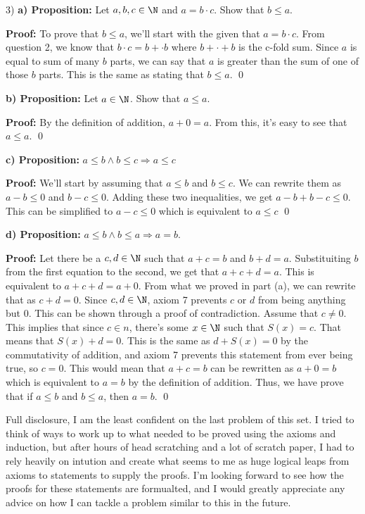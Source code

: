     \begin{paragraph}{3)}
        \textbf{a) Proposition:} Let $a, b, c \in \N$ and $a = b \cdot c$. Show that $b \leq a$.
        \spacing

        \textbf{Proof:} To prove that $b \leq a$, we'll start with the given that $a = b \cdot c$.
        From question 2, we know that $b \cdot c = b + \cdot b$ where $b + \cdot + b$ is the c-fold sum.
        Since $a$ is equal to sum of many $b$ parts, we can say that $a$ is greater than the sum of one of those
        $b$ parts. This is the same as stating that $b \leq a$. \qed
        \bigskip

        \textbf{b) Proposition:} Let $a \in \N$. Show that $a \leq a$.
        \spacing

        \textbf{Proof:} By the definition of addition, $a + 0 = a$. From this, it's easy to see that $a \leq a$. \qed
        \bigskip

        \textbf{c) Proposition:} $a \leq b \land b \leq c \Rightarrow a \leq c$
        \spacing

        \textbf{Proof:} We'll start by assuming that $a \leq b$ and $b \leq c$. We can rewrite them as 
        $a - b \leq 0$ and $b - c \leq 0$. Adding these two inequalities, we get $a - b + b - c \leq 0$.
        This can be simplified to $a - c \leq 0$ which is equivalent to $a \leq c$ \qed
        \bigskip

        \textbf{d) Proposition:} $a \leq b \land b \leq a \Rightarrow a = b$.
        \spacing

        \textbf{Proof:} Let there be a $c, d \in \N$ such that $a + c = b$ and $b + d = a$. Substituiting $b$
        from the first equation to the second, we get that $a + c + d = a$. This is equivalent to 
        $a + c + d = a + 0$. From what we proved in part (a), we can rewrite that as $c + d = 0$. Since 
        $c, d \in \N$, axiom 7 prevents $c$ or $d$ from being anything but 0. This can be shown through a proof of
        contradiction. Assume that $c \neq 0$. This implies that since $c \in n$, there's some $x \in \N$ such that
        $S(x) = c$. That means that $S(x) + d = 0$. This is the same as $d + S(x) = 0$ by the commutativity of addition,
        and axiom 7 prevents this statement from ever being true, so $c = 0$. This would mean that $a + c = b$
        can be rewritten as $a + 0 = b$ which is equivalent to $a = b$ by the definition of addition. Thus, 
        we have prove that if $a \leq b$ and $b \leq a$, then $a = b$. \qed
        \bigskip

        Full disclosure, I am the least confident on the last problem of this set. I tried to think
        of ways to work up to what needed to be proved using the axioms and induction, but after hours of head scratching
        and a lot of scratch paper, I had to rely heavily on intution and create what seems to me as 
        huge logical leaps from axioms to statements to supply the proofs. I'm looking forward
        to see how the proofs for these statements are formualted, and I would greatly appreciate any advice
        on how I can tackle a problem similar to this in the future.
    \end{paragraph}
